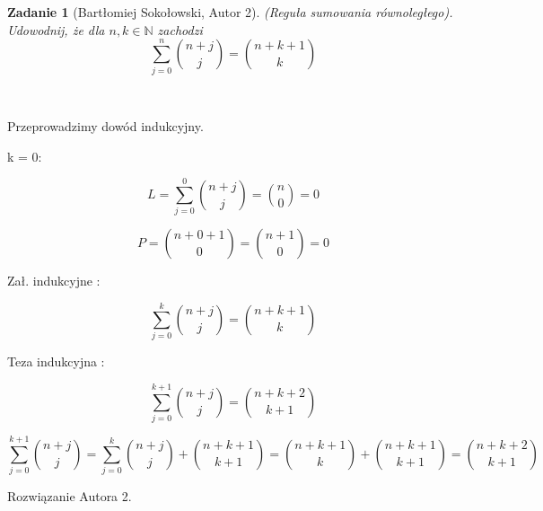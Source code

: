 \documentclass{mwart}
\newtheorem{zad}{Zadanie}[section]
\begin{document}
\begin{zad}[Bartłomiej Sokołowski, Autor 2]
    (Reguła sumowania równoległego). Udowodnij, że dla $n, k \in \mathbb{N}$
    zachodzi \[ \sum_{j= 0}^{n}\binom{n+j}{j} = \binom{n+k+1}{k}   \]
\end{zad}\
\begin{mdframed}
    Przeprowadzimy dowód indukcyjny. 
    \item k = 0:
    \item \[ L = \sum_{j=0}^{0}\binom{n+j}{j} = \binom{n}{0} = 0 \] 
    \item \[P = \binom{n+0+1}{0} = \binom{n+1}{0} = 0\]
    \item Zał. indukcyjne :
    \item \[\sum_{j=0}^{k}\binom{n+j}{j} = \binom{n+k+1}{k}\]
    \item Teza indukcyjna :
    \item \[\sum_{j=0}^{k+1}\binom{n+j}{j} = \binom{n+k+2}{k+1}\]
    \item \[\sum_{j=0}^{k+1}\binom{n+j}{j} = \sum_{j=0}^{k}\binom{n+j}{j} + \binom{n+k+1}{k+1} = \binom{n+k+1}{k} + \binom{n+k+1}{k+1} = \binom{n+k+2}{k+1}\]
\end{mdframed}
\begin{mdframed}
    Rozwiązanie Autora 2.
\end{mdframed}
\end{document}
